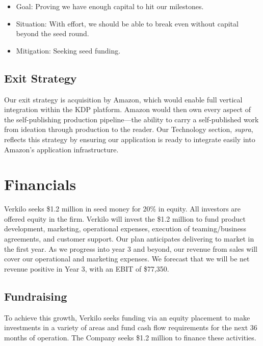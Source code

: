 \documentclass[10pt,openany]{book}
\providecommand{\tightlist}{%
  \setlength{\itemsep}{0pt}\setlength{\parskip}{0pt}}
\begin{document}
\begin{itemize}
\tightlist
\item
  Goal: Proving we have enough capital to hit our milestones.
\item
  Situation: With effort, we should be able to break even without
  capital beyond the seed round.
\item
  Mitigation: Seeking seed funding.
\end{itemize}

\hypertarget{exit-strategy}{%
\section{Exit Strategy}\label{exit-strategy}}

Our exit strategy is acquisition by Amazon, which would enable full
vertical integration within the KDP platform. Amazon would then own
every aspect of the self-publishing production pipeline---the ability to
carry a self-published work from ideation through production to the
reader. Our Technology section, \emph{supra}, reflects this strategy by
ensuring our application is ready to integrate easily into Amazon's
application infrastructure.

\hypertarget{financials}{%
\chapter{Financials}\label{financials}}

Verkilo seeks \$1.2 million in seed money for 20\% in equity. All
investors are offered equity in the firm. Verkilo will invest the \$1.2
million to fund product development, marketing, operational expenses,
execution of teaming/business agreements, and customer support. Our plan
anticipates delivering to market in the first year. As we progress into
year 3 and beyond, our revenue from sales will cover our operational and
marketing expenses. We forecast that we will be net revenue positive in
Year 3, with an EBIT of \$77,350.

\hypertarget{fundraising}{%
\section{Fundraising}\label{fundraising}}

To achieve this growth, Verkilo seeks funding via an equity placement to
make investments in a variety of areas and fund cash flow requirements
for the next 36 months of operation. The Company seeks \$1.2 million to
finance these activities.
\end{document}
